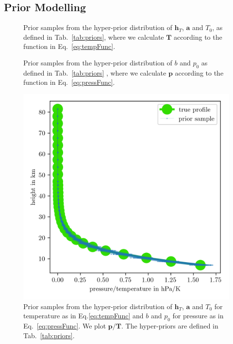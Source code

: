\subsection{Prior Modelling}
\begin{figure}[ht!]
	\centering
	
	\caption[Prior Samples of $\bm{T}$ according to the respective hyper-prior distribution.]{Prior samples from the hyper-prior distribution of $\bm{h}_T$, $\bm{a}$ and $T_0$, as defined in Tab.~\ref{tab:priors}, where we calculate $\bm{T}$ according to the function in Eq.~\ref{eq:tempFunc}.}
	\label{fig:PriorTemp}
\end{figure}

\begin{figure}[ht!]
	\centering
	
	\caption[Prior Samples of $\bm{p}$ according to the respective hyper-prior distribution.]{Prior samples from the hyper-prior distribution of $b$ and $p_0$ as defined in Tab.~\ref{tab:priors} , where we calculate $\bm{p}$ according to the function in Eq.~\ref{eq:pressFunc}.}
	\label{fig:PriorPress}
\end{figure}
\begin{figure}[ht!]
	\centering
	\includegraphics{PriorTempOverPostMeanSigm.png}
	\caption[Prior Samples of $\bm{p}/\bm{T}$ according to the respective hyper-prior distribution.]{Prior samples from the hyper-prior distribution of $\bm{h}_T$, $\bm{a}$ and $T_0$ for temperature as in Eq.\ref{eq:tempFunc} and $b$ and $p_0$ for pressure as in Eq.~\ref{eq:pressFunc}. We plot $\bm{p}/\bm{T}$. The hyper-priors are defined in Tab.~\ref{tab:priors}.}
	\label{fig:PriorPressOverTemp}
\end{figure}

